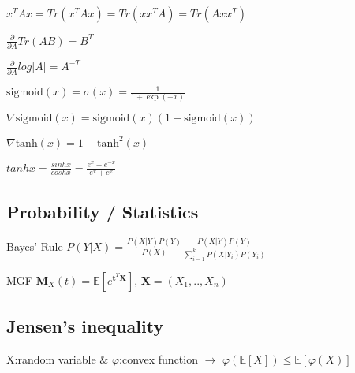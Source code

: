 \begin{inparaitem}[\color{red}\textbullet]
	\item $x^T A x = Tr(x^T A x) = Tr(x x^T A) = Tr(A x x^T)$ \\
	\item $\tfrac{\partial}{\partial A} Tr(AB) {=} B^T$
	\item $\frac{\partial}{\partial A} log|A| {=} A^{-T}$ \\
	\item $\text{sigmoid}(x) = \sigma(x) = \frac{1}{1+\exp(-x)}$ \\
	\item $\nabla \text{sigmoid}(x) = \text{sigmoid}(x)(1-\text{sigmoid}(x))$ \\
	\item $\nabla \text{tanh}(x) = 1-\text{tanh}^2(x)$ 
	\item $tanhx {=} \frac{sinhx}{coshx} {=} \frac{e^{x}-e^{-x}}{e^{x} + e^{x}}$
\end{inparaitem}
\subsection*{Probability / Statistics}
\begin{compactdesc}
	\item[Bayes' Rule]$ P(Y|X) = \frac{P(X|Y)P(Y)}{P(X)}\frac{P(X|Y)P(Y)}{\sum\limits^k_{i=1}P(X|Y_i)P(Y_i)}$\\
	\item[MGF] $\mathbf{M}_X(t)=\mathbb{E}[e^{\mathbf{t}^T \mathbf{X}}]$, $\mathbf{X}=(X_1,.., X_n) $
\end{compactdesc}
\subsection*{Jensen's inequality}
	X:random variable \& $\varphi$:convex function $\rightarrow$ $\varphi(\mathbb{E}[X]) \leq \mathbb{E}[\varphi(X)]$
